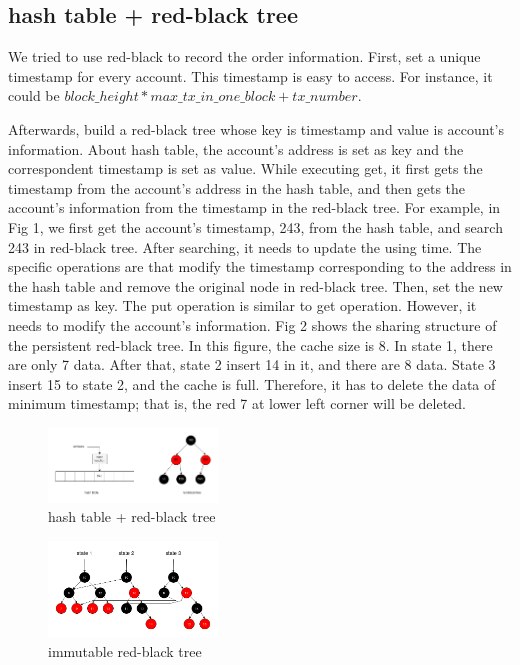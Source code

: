 \documentclass[conference]{IEEEtran}
\begin{document}
\subsection{hash table + red-black tree}
We tried to use red-black to record the order information.
First, set a unique timestamp for every account.
This timestamp is easy to access. For instance,
it could be $block\_height * max\_tx\_in\_one\_block+ tx\_number$.

Afterwards, build a red-black tree whose key is timestamp and value is account’s information. About hash table, the account's address is set as key and the correspondent timestamp is set as value.
While executing get, it first gets the timestamp from the account's address in the hash table, and then gets the account’s information from the timestamp in the red-black tree. For example, in Fig 1, we first get the account’s timestamp, 243, from the hash table, and search 243 in red-black tree.
After searching, it needs to update the using time. The specific operations are that modify the timestamp corresponding to the address in the hash table and remove the original node in red-black tree. Then, set the new timestamp as key. The put operation is similar to get operation. However, it needs to modify the account's information. 
Fig 2 shows the sharing structure of the persistent red-black tree. In this figure, the cache size is 8. In state 1, there are only 7 data. After that, state 2 insert 14 in it, and there are 8 data. State 3 insert 15 to state 2, and the cache is full. Therefore, it has to delete the data of minimum timestamp; that is, the red 7 at lower left corner will be deleted.

\begin{figure}
  \centering
  \includegraphics[width=0.4\textwidth]{../images/ht-rb-tree}
  \caption{hash table + red-black tree}
\end{figure}

\begin{figure}
  \centering
  \includegraphics[width=0.4\textwidth]{../images/immutable-rb-tree}
  \caption{immutable red-black tree}
\end{figure}
\end{document}
